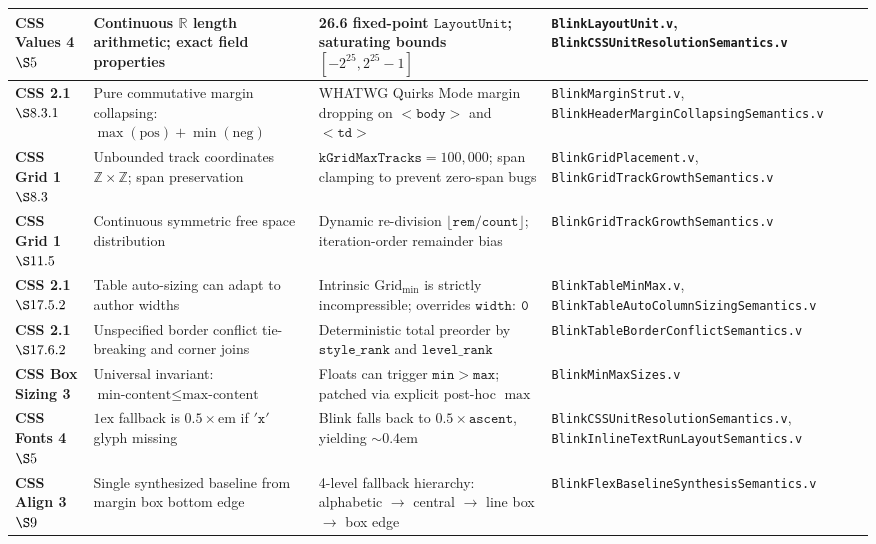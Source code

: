 \documentclass[11pt,a4paper]{article}
\theoremstyle{definition}
\begin{document}
\begin{longtable}{p{2.3cm}p{3.8cm}p{4.4cm}p{4.5cm}}
\textbf{CSS Values 4 $\S 5$} & Continuous $\mathbb{R}$ length arithmetic; exact field properties & 26.6 fixed-point $\mathtt{LayoutUnit}$; saturating bounds $[-2^{25}, 2^{25}-1]$ & \texttt{BlinkLayoutUnit.v}, \texttt{BlinkCSSUnitResolution}\allowbreak\texttt{Semantics.v} \\
\midrule
\textbf{CSS 2.1 $\S 8.3.1$} & Pure commutative margin collapsing: $\max(\text{pos}) + \min(\text{neg})$ & WHATWG Quirks Mode margin dropping on $\mathtt{<body>}$ and $\mathtt{<td>}$ & \texttt{BlinkMarginStrut.v}, \texttt{BlinkHeaderMargin}\allowbreak\texttt{CollapsingSemantics.v} \\
\midrule
\textbf{CSS Grid 1 $\S 8.3$} & Unbounded track coordinates $\mathbb{Z} \times \mathbb{Z}$; span preservation & $\mathtt{kGridMaxTracks} = 100{,}000$; span clamping to prevent zero-span bugs & \texttt{BlinkGridPlacement.v}, \texttt{BlinkGridTrackGrowth}\allowbreak\texttt{Semantics.v} \\
\midrule
\textbf{CSS Grid 1 $\S 11.5$} & Continuous symmetric free space distribution & Dynamic re-division $\lfloor \mathtt{rem} / \mathtt{count} \rfloor$; iteration-order remainder bias & \texttt{BlinkGridTrackGrowth}\allowbreak\texttt{Semantics.v} \\
\midrule
\textbf{CSS 2.1 $\S 17.5.2$} & Table auto-sizing can adapt to author widths & Intrinsic $\text{Grid}_{\min}$ is strictly incompressible; overrides $\mathtt{width:\ 0}$ & \texttt{BlinkTableMinMax.v}, \texttt{BlinkTableAutoColumn}\allowbreak\texttt{SizingSemantics.v} \\
\midrule
\textbf{CSS 2.1 $\S 17.6.2$} & Unspecified border conflict tie-breaking and corner joins & Deterministic total preorder by $\mathtt{style\_rank}$ and $\mathtt{level\_rank}$ & \texttt{BlinkTableBorderConflict}\allowbreak\texttt{Semantics.v} \\
\midrule
\textbf{CSS Box Sizing 3} & Universal invariant: $\text{min-content} \le \text{max-content}$ & Floats can trigger $\mathtt{min} > \mathtt{max}$; patched via explicit post-hoc $\max$ & \texttt{BlinkMinMaxSizes.v} \\
\midrule
\textbf{CSS Fonts 4 $\S 5$} & $1\text{ex}$ fallback is $0.5 \times \text{em}$ if $\mathtt{'x'}$ glyph missing & Blink falls back to $0.5 \times \mathtt{ascent}$, yielding $\sim 0.4\text{em}$ & \texttt{BlinkCSSUnitResolution}\allowbreak\texttt{Semantics.v}, \texttt{BlinkInlineTextRunLayout}\allowbreak\texttt{Semantics.v} \\
\midrule
\textbf{CSS Align 3 $\S 9$} & Single synthesized baseline from margin box bottom edge & 4-level fallback hierarchy: alphabetic $\to$ central $\to$ line box $\to$ box edge & \texttt{BlinkFlexBaselineSynthesis}\allowbreak\texttt{Semantics.v} \\

\end{longtable}
\end{document}
